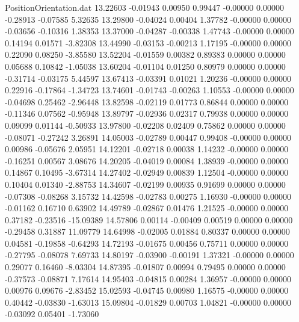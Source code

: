 \begin{filecontents}{PositionOrientation.dat}
  13.22603   -0.01943    0.00950     0.99447   -0.00000    0.00000   -0.28913   -0.07585    5.32635
  13.29800   -0.04024    0.00404     1.37782   -0.00000    0.00000   -0.03656   -0.10316    1.38353
  13.37000   -0.04287   -0.00338     1.47743   -0.00000    0.00000    0.14194    0.01571   -3.82308
  13.44990   -0.03153   -0.00213     1.17195   -0.00000    0.00000    0.22090    0.08250   -3.85580
  13.52204   -0.01559    0.00382     0.89383    0.00000    0.00000    0.05688    0.10842   -1.05038
  13.60204   -0.01104    0.01250     0.80979    0.00000    0.00000   -0.31714   -0.03175    5.44597
  13.67413   -0.03391    0.01021     1.20236   -0.00000    0.00000    0.22916   -0.17864   -1.34723
  13.74601   -0.01743   -0.00263     1.10553   -0.00000    0.00000   -0.04698    0.25462   -2.96448
  13.82598   -0.02119    0.01773     0.86844    0.00000    0.00000   -0.11346    0.07562   -0.95948
  13.89797   -0.02936    0.02317     0.79938    0.00000    0.00000    0.09099    0.01144   -0.50933
  13.97800   -0.02208    0.02409     0.75862    0.00000    0.00000   -0.08071   -0.27242    3.26891
  14.05003   -0.02789    0.00447     0.99408   -0.00000    0.00000    0.00986   -0.05676    2.05951
  14.12201   -0.02718    0.00038     1.14232   -0.00000    0.00000   -0.16251    0.00567    3.08676
  14.20205   -0.04019    0.00084     1.38939   -0.00000    0.00000    0.14867    0.10495   -3.67314
  14.27402   -0.02949    0.00839     1.12504   -0.00000    0.00000    0.10404    0.01340   -2.88753
  14.34607   -0.02199    0.00935     0.91699    0.00000    0.00000   -0.07308   -0.08268    3.15732
  14.42598   -0.02783    0.00275     1.16930   -0.00000    0.00000   -0.01162    0.16710    0.63902
  14.49789   -0.02867    0.01476     1.21525   -0.00000    0.00000    0.37182   -0.23516  -15.09389
  14.57806    0.00114   -0.00409     0.00519    0.00000    0.00000   -0.29458    0.31887   11.09779
  14.64998   -0.02005    0.01884     0.80337    0.00000    0.00000    0.04581   -0.19858   -0.64293
  14.72193   -0.01675    0.00456     0.75711    0.00000    0.00000   -0.27795   -0.08078    7.69733
  14.80197   -0.03900   -0.00191     1.37321   -0.00000    0.00000    0.29077    0.16460   -8.03304
  14.87395   -0.01807    0.00994     0.79495    0.00000    0.00000   -0.37573   -0.08871    7.17614
  14.95403   -0.04815    0.00284     1.36957   -0.00000    0.00000    0.00976    0.09676   -2.83452
  15.02593   -0.04745    0.00980     1.16575   -0.00000    0.00000    0.40442   -0.03830   -1.63013
  15.09804   -0.01829    0.00703     1.04821   -0.00000    0.00000   -0.03092    0.05401   -1.73060

\end{filecontents}
